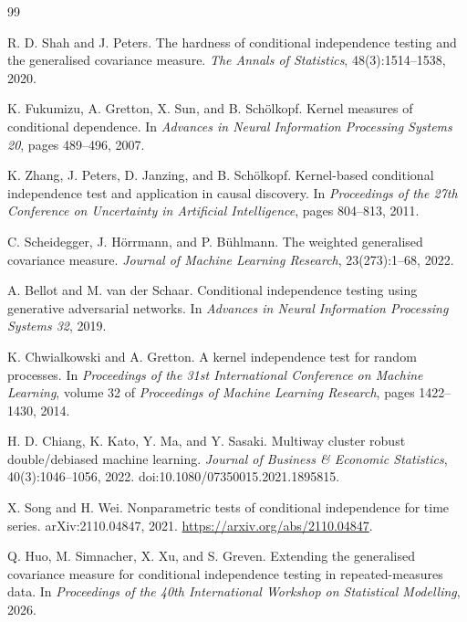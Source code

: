 \documentclass[11pt]{article}
\theoremstyle{definition}
\begin{document}
\begin{thebibliography}{99}

R. D. Shah and J. Peters.
\newblock The hardness of conditional independence testing and the generalised covariance measure.
\newblock \emph{The Annals of Statistics}, 48(3):1514--1538, 2020.

K. Fukumizu, A. Gretton, X. Sun, and B. Sch\"olkopf.
\newblock Kernel measures of conditional dependence.
\newblock In \emph{Advances in Neural Information Processing Systems 20}, pages 489--496, 2007.

K. Zhang, J. Peters, D. Janzing, and B. Sch\"olkopf.
\newblock Kernel-based conditional independence test and application in causal discovery.
\newblock In \emph{Proceedings of the 27th Conference on Uncertainty in Artificial Intelligence},
pages 804--813, 2011.

C. Scheidegger, J. H\"orrmann, and P. B\"uhlmann.
\newblock The weighted generalised covariance measure.
\newblock \emph{Journal of Machine Learning Research}, 23(273):1--68, 2022.

A. Bellot and M. van der Schaar.
\newblock Conditional independence testing using generative adversarial networks.
\newblock In \emph{Advances in Neural Information Processing Systems 32}, 2019.

K. Chwialkowski and A. Gretton.
\newblock A kernel independence test for random processes.
\newblock In \emph{Proceedings of the 31st International Conference on Machine Learning},
volume 32 of \emph{Proceedings of Machine Learning Research}, pages 1422--1430, 2014.

H. D. Chiang, K. Kato, Y. Ma, and Y. Sasaki.
\newblock Multiway cluster robust double/debiased machine learning.
\newblock \emph{Journal of Business \& Economic Statistics}, 40(3):1046--1056, 2022.
\newblock doi:10.1080/07350015.2021.1895815.

X. Song and H. Wei.
\newblock Nonparametric tests of conditional independence for time series.
\newblock arXiv:2110.04847, 2021.
\newblock \url{https://arxiv.org/abs/2110.04847}.

Q. Huo, M. Simnacher, X. Xu, and S. Greven.
\newblock Extending the generalised covariance measure for conditional independence testing in repeated-measures data.
\newblock In \emph{Proceedings of the 40th International Workshop on Statistical Modelling}, 2026.


\end{thebibliography}
\end{document}
